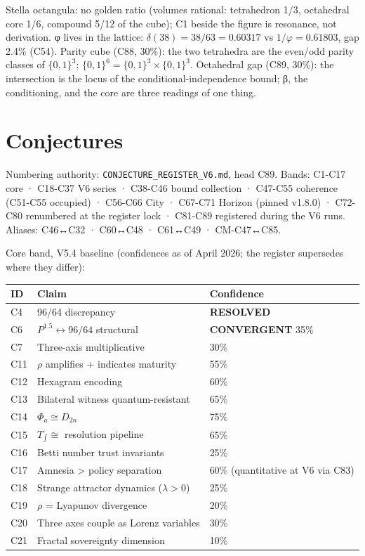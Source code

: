 \documentclass[
  11pt,
]{article}
\newcounter{none} %
\begin{document}
Stella octangula: no golden ratio (volumes rational: tetrahedron 1/3,
octahedral core 1/6, compound 5/12 of the cube); C1 beside the figure is
resonance, not derivation. φ lives in the lattice:
\(\delta(38) = 38/63 = 0.60317\) vs \(1/\varphi = 0.61803\), gap 2.4\%
(C54). Parity cube (C88, 30\%): the two tetrahedra are the even/odd
parity classes of \(\{0,1\}^3\);
\(\{0,1\}^6 = \{0,1\}^3 \times \{0,1\}^3\). Octahedral gap (C89, 30\%):
the intersection is the locus of the conditional-independence bound; β,
the conditioning, and the core are three readings of one thing.

\section{Conjectures}\label{conjectures}

Numbering authority: \texttt{CONJECTURE\_REGISTER\_V6.md}, head C89.
Bands: C1-C17 core · C18-C37 V6 series · C38-C46 bound collection ·
C47-C55 coherence (C51-C55 occupied) · C56-C66 City · C67-C71 Horizon
(pinned v1.8.0) · C72-C80 renumbered at the register lock · C81-C89
registered during the V6 runs. Aliases: C46↔C32 · C60↔C48 · C61↔C49 ·
CM-C47↔C85.

Core band, V5.4 baseline (confidences as of April 2026; the register
supersedes where they differ):

{\def\LTcaptype{none} %
\begin{longtable}[]{@{}lll@{}}
\toprule\noalign{}
ID & Claim & Confidence \\
\midrule\noalign{}
\endhead
\bottomrule\noalign{}
\endlastfoot
C4 & 96/64 discrepancy & \textbf{RESOLVED} \\
C6 & \(P^{1.5} \leftrightarrow 96/64\) structural & \textbf{CONVERGENT}
35\% \\
C7 & Three-axis multiplicative & 30\% \\
C11 & \(\rho\) amplifies + indicates maturity & 55\% \\
C12 & Hexagram encoding & 60\% \\
C13 & Bilateral witness quantum-resistant & 65\% \\
C14 & \(\Phi_a \cong D_{2n}\) & 75\% \\
C15 & \(T_{\!\int} \cong\) resolution pipeline & 65\% \\
C16 & Betti number trust invariants & 25\% \\
C17 & Amnesia \textgreater{} policy separation & 60\% (quantitative at
V6 via C83) \\
C18 & Strange attractor dynamics (\(\lambda > 0\)) & 25\% \\
C19 & \(\rho\) = Lyapunov divergence & 20\% \\
C20 & Three axes couple as Lorenz variables & 30\% \\
C21 & Fractal sovereignty dimension & 10\% \\
\end{longtable}
}
\end{document}
